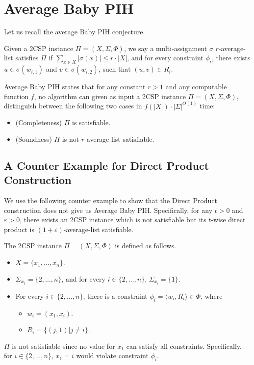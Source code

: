 \section{Average Baby PIH}
\label{sec:avg}

\noindent Let us recall the average Baby PIH conjecture. 
\begin{hypothesis}
    Given a 2CSP instance $\Pi=(X,\Sigma,\Phi)$, we say a multi-assignment $\sigma$ $r$-average-list satisfies $\Pi$ if $\sum_{x \in X}|\sigma(x)|\le r\cdot |X|$, and for every constraint $\phi_i$, there exists $u \in \sigma(w_{i,1})$ and $v \in \sigma(w_{i,2})$, such that $(u,v) \in R_i$.

    Average Baby PIH states that for any constant $r>1$ and any computable function $f$, no algorithm can given as input a 2CSP instance $\Pi=(X,\Sigma,\Phi)$, distinguish between the following two cases in $f(|X|)\cdot |\Sigma|^{O(1)}$ time:
    \begin{itemize}
        \item (Completeness) $\Pi$ is satisfiable.
        \item (Soundness) $\Pi$ is not $r$-average-list satisfiable.
    \end{itemize}
\end{hypothesis}

\subsection{A Counter Example for Direct Product Construction}

We use the following counter example to show that the Direct Product construction does not give us Average Baby PIH. Specifically, for any $t>0$ and $\varepsilon>0$, there exists an 2CSP instance which is not satisfiable but its $t$-wise direct product is $(1+\varepsilon)$-average-list satisfiable.

\begin{example}\label{ex:1}
    The 2CSP instance $\Pi=(X,\Sigma,\Phi)$ is defined as follows.
    \begin{itemize}
        \item $X=\{x_1,\ldots,x_n\}$.
        \item $\Sigma_{x_1}=\{2,\ldots,n\}$, and for every $i \in \{2,\ldots,n\}$, $\Sigma_{x_i}=\{1\}$.
        \item For every $i \in \{2,\ldots,n\}$, there is a constraint $\phi_i=\langle w_i,R_i\rangle \in \Phi$, where
        \begin{itemize}
            \item $w_i=(x_1,x_i)$.
            \item $R_i=\{(j,1) | j \ne i\}$.
        \end{itemize}
    \end{itemize}
    \end{example}
    $\Pi$ is not satisfiable since no value for $x_1$ can satisfy all constraints. Specifically, for $i \in \{2,\ldots,n\}$, $x_1=i$ would violate constraint $\phi_i$.

